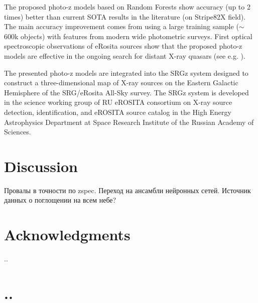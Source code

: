 \documentclass[fleqn,usenatbib]{mnras}
\begin{document}

The proposed photo-z models based on Random Forests show accuracy (up to 2 times) better than current SOTA results in the literature (on Stripe82X field). The main accuracy improvement comes from using a large training sample ($\sim$600k objects) with features from modern wide photometric surveys. First optical spectroscopic observations of eRosita sources show that the proposed photo-z models are effective in the ongoing search for distant X-ray quasars (see e.g. \citep{2020MNRAS.497.1842M,2020AstL...46..149K,2020AstL...46..429D}).

The presented photo-z models are integrated into the SRGz system designed to construct a three-dimensional map of X-ray sources on the Eastern Galactic Hemisphere of the SRG/eRosita All-Sky survey. The SRGz system is developed in the science working group of RU eROSITA consortium on X-ray source detection, identification, and eROSITA source catalog in the High Energy Astrophysics Department at Space Research Institute of the Russian Academy of Sciences.


\section{Discussion}

Провалы в точности по zspec. Переход на ансамбли нейронных сетей. Источник данных о поглощении на всем небе?

\section*{Acknowledgments}
..




\appendix

\section{..}
\end{document}
